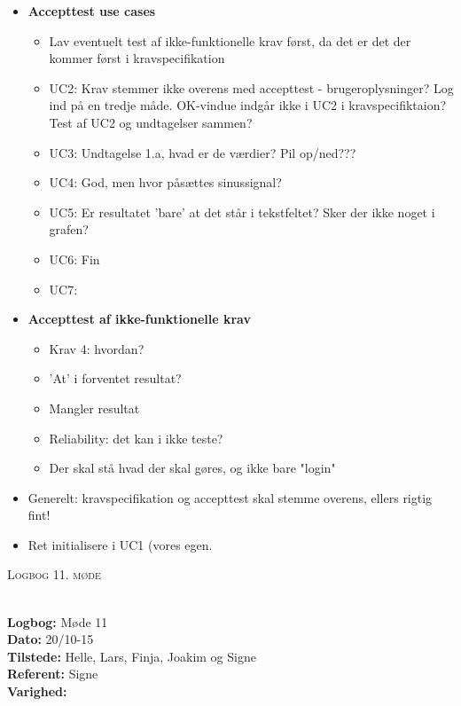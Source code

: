 \documentclass[a4paper,11pt,oneside]{memoir}
\begin{document}
\begin{itemize}
\begin{itemize}
\end{itemize}
\item \textbf{Accepttest use cases}
\begin{itemize}
\item Lav eventuelt test af ikke-funktionelle krav først, da det er det der kommer først i kravspecifikation
\item UC2: Krav stemmer ikke overens med accepttest - brugeroplysninger? Log ind på en tredje måde. OK-vindue indgår ikke i UC2 i kravspecifiktaion? Test af UC2 og undtagelser sammen? 
\item UC3: Undtagelse 1.a, hvad er de værdier? Pil op/ned???
\item UC4: God, men hvor påsættes sinussignal?
\item UC5: Er resultatet 'bare' at det står i tekstfeltet? Sker der ikke noget i grafen?
\item UC6: Fin
\item UC7:  
\end{itemize}
\item \textbf{Accepttest af ikke-funktionelle krav}
\begin{itemize}
\item Krav 4: hvordan?
\item 'At' i forventet resultat?
\item Mangler resultat
\item Reliability: det kan i ikke teste?
\item Der skal stå hvad der skal gøres, og ikke bare "login"
\end{itemize}
\item Generelt: kravspecifikation og accepttest skal stemme overens, ellers rigtig fint!
\item Ret initialisere i UC1 (vores egen. 
\end{itemize}

\newpage


\begin{center} 
\huge{\textsc{Logbog 11. møde}}
\end{center}

\textbf{ }
\\
\textbf{Logbog:} Møde 11
\\
\textbf{Dato:} 20/10-15
\\
\textbf{Tilstede:} Helle, Lars, Finja, Joakim og Signe
\\
\textbf{Referent:} Signe
\\
\textbf{Varighed:} 
\\
\end{document}
